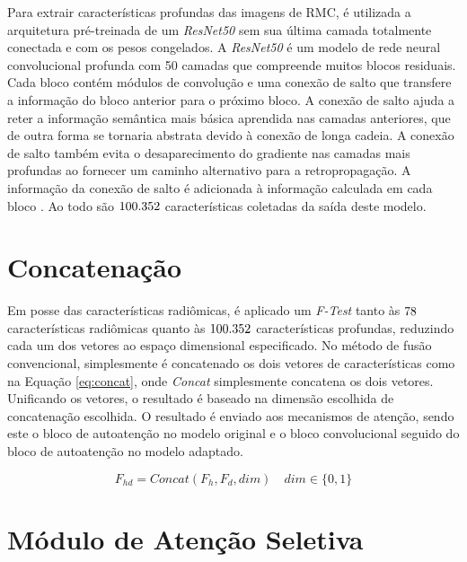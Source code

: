 Para extrair características profundas das imagens de \gls{RMC}, é utilizada a arquitetura pré-treinada de um \textit{ResNet50} sem sua última camada totalmente conectada e com os pesos congelados. A \textit{ResNet50} é um modelo de rede neural convolucional profunda com 50 camadas que compreende muitos blocos residuais. Cada bloco contém módulos de convolução e uma conexão de salto que transfere a informação do bloco anterior para o próximo bloco. A conexão de salto ajuda a reter a informação semântica mais básica aprendida nas camadas anteriores, que de outra forma se tornaria abstrata devido à conexão de longa cadeia. A conexão de salto também evita o desaparecimento do gradiente nas camadas mais profundas ao fornecer um caminho alternativo para a retropropagação. A informação da conexão de salto é adicionada à informação calculada em cada bloco \cite{aiSelfAttentionBasedFusion2023}. Ao todo são $100.352$ características coletadas da saída deste modelo.

\section{Concatenação}
\label{subsec:cap4_concatenacao}

Em posse das características radiômicas, é aplicado um \textit{F-Test} tanto às $78$ características radiômicas quanto às $100.352$ características profundas, reduzindo cada um dos vetores ao espaço dimensional especificado. No método de fusão convencional, simplesmente é concatenado os dois vetores de características como na Equação \ref{eq:concat}, onde \textit{Concat} simplesmente concatena os dois vetores. Unificando os vetores, o resultado é baseado na dimensão escolhida de concatenação escolhida. O resultado é enviado aos mecanismos de atenção, sendo este o bloco de autoatenção no modelo original e o bloco convolucional seguido do bloco de autoatenção no modelo adaptado.

\begin{equation}
F_{hd} = \textit{Concat}(F_h, F_d, dim) \quad dim \in \{0,1\}
\label{eq:concat}
\end{equation}

\section{Módulo de Atenção Seletiva}
\label{subsec:cap4_mod_selective_attn}

